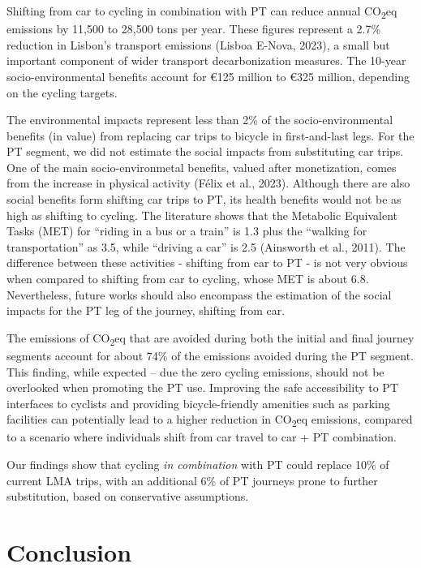 \documentclass[review, doubleblind, 3p,
authoryear]{elsarticle} %
\begin{document}
Shifting from car to cycling in combination with PT can reduce annual
CO\textsubscript{2}eq emissions by 11,500 to 28,500 tons per year. These
figures represent a 2.7\% reduction in Lisbon's transport emissions
(Lisboa E-Nova, 2023), a small but important component of wider
transport decarbonization measures. The 10-year socio-environmental
benefits account for €125 million to €325 million, depending on the
cycling targets.

The environmental impacts represent less than 2\% of the
socio-environmental benefits (in value) from replacing car trips to
bicycle in first-and-last legs. For the PT segment, we did not estimate
the social impacts from substituting car trips. One of the main
socio-environmetal benefits, valued after monetization, comes from the
increase in physical activity (Félix et al., 2023). Although there are
also social benefits form shifting car trips to PT, its health benefits
would not be as high as shifting to cycling. The literature shows that
the Metabolic Equivalent Tasks (MET) for ``riding in a bus or a train''
is 1.3 plus the ``walking for transportation'' as 3.5, while ``driving a
car'' is 2.5 (Ainsworth et al., 2011). The difference between these
activities - shifting from car to PT - is not very obvious when compared
to shifting from car to cycling, whose MET is about 6.8. Nevertheless,
future works should also encompass the estimation of the social impacts
for the PT leg of the journey, shifting from car.

The emissions of CO\textsubscript{2}eq that are avoided during both the
initial and final journey segments account for about 74\% of the
emissions avoided during the PT segment. This finding, while expected --
due the zero cycling emissions, should not be overlooked when promoting
the PT use. Improving the safe accessibility to PT interfaces to
cyclists and providing bicycle-friendly amenities such as parking
facilities can potentially lead to a higher reduction in
CO\textsubscript{2}eq emissions, compared to a scenario where
individuals shift from car travel to car + PT combination.

Our findings show that cycling \emph{in combination} with PT could
replace 10\% of current LMA trips, with an additional 6\% of PT journeys
prone to further substitution, based on conservative assumptions.

\hypertarget{conclusion}{%
\section{Conclusion}\label{conclusion}}
\end{document}
